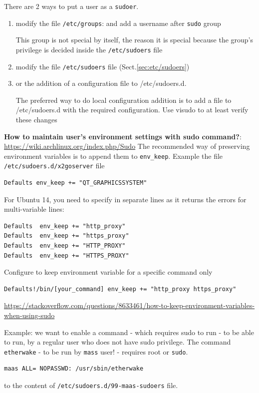 There are 2 ways to put a user as a \verb!sudoer!. 
\begin{enumerate}
  \item modify the file \verb!/etc/groups!: and add a username after \verb!sudo! group
  
  
  This group is not special by itself, the reason it is special because the group's privilege is decided 
  inside the \verb!/etc/sudoers! file 
  
  
  
  \item modify the file \verb!/etc/sudoers! file (Sect.\ref{sec:etc/sudoers})
  

  \item or the addition of a configuration file to /etc/sudoers.d.
  
  The preferred way to do local configuration addition is to add a file to /etc/sudoers.d with the required configuration.
  Use visudo to at least verify these changes
  
\end{enumerate}

{\bf How to maintain user's environment settings with sudo command?}:
\url{https://wiki.archlinux.org/index.php/Sudo}
The recommended way of preserving environment variables is to append them to \verb!env_keep!. Example
the file \verb!/etc/sudoers.d/x2goserver! file
\begin{verbatim}
Defaults env_keep += "QT_GRAPHICSSYSTEM"
\end{verbatim}
For Ubuntu 14, you need to specify in separate lines as it returns the errors for multi-variable lines:
\begin{verbatim}
Defaults  env_keep += "http_proxy"
Defaults  env_keep += "https_proxy"
Defaults  env_keep += "HTTP_PROXY"
Defaults  env_keep += "HTTPS_PROXY"
\end{verbatim}

Configure to keep environment variable for a specific command only
\begin{verbatim}
Defaults!/bin/[your_command] env_keep += "http_proxy https_proxy"
\end{verbatim}
\url{https://stackoverflow.com/questions/8633461/how-to-keep-environment-variables-when-using-sudo}

Example: we want to enable a command - which requires sudo to run - to be able to run, by a regular user who does not have sudo privilege. 
The command \verb!etherwake! - to be run by \verb!mass! user! - requires root or \verb!sudo!. 
\begin{verbatim}
maas ALL= NOPASSWD: /usr/sbin/etherwake
\end{verbatim}
to the content of \verb!/etc/sudoers.d/99-maas-sudoers! file.


